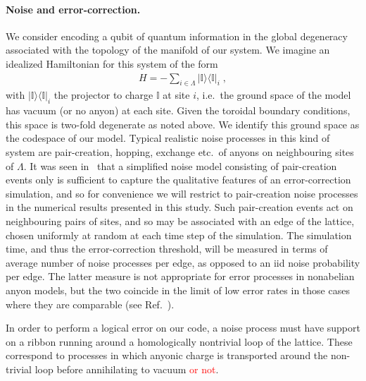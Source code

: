 \documentclass[aps, prl, letterpaper, twocolumn, superscriptaddress, notitlepage, 10pt]{revtex4-1}
\newcommand{\ket}[1]{|{#1}\rangle}
\newcommand{\bra}[1]{\langle{#1}|}
\newcommand{\ketbra}[2]{\ket{#1}\!\bra{#2}}
\newcommand{\proj}[1]{\ketbra{#1}{#1}}
\newcommand{\dude}[1]{\textcolor{red}{#1}}
\begin{document}
\paragraph{Noise and error-correction.}

We consider encoding a qubit of quantum information in the global degeneracy associated 
with the topology of the manifold of our system. We imagine an idealized Hamiltonian for this 
system of the form
\begin{align}
	H=-\sum_{i\in \Lambda}\proj{\mathbb{I}}_i\;,\label{e:hamiltonian}
\end{align}
with $\proj{\mathbb{I}}_i$ the projector to charge $\mathbb{I}$ at site $i$, i.e.~the ground 
space of the model has vacuum (or no anyon) at each site. Given the toroidal boundary 
conditions, this space is two-fold degenerate as noted above. We identify this ground space 
as the codespace of our model. Typical realistic noise processes in this kind of system are 
pair-creation, hopping, exchange etc.~of anyons on neighbouring sites of $\Lambda$. It was 
seen in~\cite{Brell2013} that a simplified noise model consisting of pair-creation events only 
is sufficient to capture the qualitative features of an error-correction simulation, and so for convenience we 
will restrict to pair-creation noise processes in the numerical results presented in this study. Such pair-creation events act 
on neighbouring pairs of sites, and so may be associated with an edge of the lattice, chosen 
uniformly at random at each time step of the simulation. The simulation time, and thus the 
error-correction threshold, will be measured in terms of average number of noise processes 
per edge, as opposed to an iid noise probability per edge. The latter measure is not 
appropriate for error processes in nonabelian anyon models, but the two coincide in the limit 
of low error rates in those cases where they are comparable (see Ref.~\cite{Brell2013}).

In order to perform a logical error on our code, a noise process must have support on a 
ribbon running around a homologically nontrivial loop of the lattice. These correspond to 
processes in which anyonic charge is transported around the non-trivial loop before 
annihilating to vacuum \dude{or not}.
\end{document}
